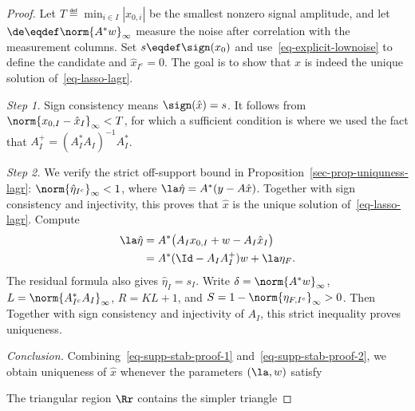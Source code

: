 \begin{proof}
    Let $T \eqdef \min_{i \in I} |x_{0,i}|$ be the smallest nonzero signal amplitude, and let $\de \eqdef \norm{A^* w}_\infty$
    measure the noise after correlation with the measurement columns.
    Set $s \eqdef \sign(x_0)$ and use~\eqref{eq-explicit-lownoise} to define the candidate
	and $\hat x_{I^c}=0$. The goal is to show that $\hat x$ is indeed the unique solution of~\eqref{eq-lasso-lagr}. 
	
	
    \noindent\textit{Step 1.} Sign consistency means $\sign(\hat x)=s$. It follows from $\norm{x_{0,I}-\hat x_I}_\infty < T$, for which a sufficient condition is
	where we used the fact that $A_I^+ = (A_I^*A_I)^{-1} A_I^*$.
	
    \noindent\textit{Step 2.} We verify the strict off-support bound in Proposition~\ref{sec-prop-uniquness-lagr}: $\norm{\hat \eta_{I^c}}_\infty < 1$, where $\la \hat \eta = A^* (y-A \hat x)$. Together with sign consistency and injectivity, this proves that $\hat x$ is the unique solution of~\eqref{eq-lasso-lagr}. Compute
	\begin{align*}
		\la \hat \eta &= A^*\big(A_Ix_{0,I}+w-A_I\hat x_I\big) \\
			&=  A^* ( \Id - A_I A_I^+ ) w + \la \eta_F.
	\end{align*}
The residual formula also gives $\hat\eta_I=s_I$. Write $\delta=\norm{A^*w}_\infty$, $L=\norm{A_{I^c}^*A_I}_\infty$, $R=KL+1$, and $S=1-\norm{\eta_{F,I^c}}_\infty>0$. Then
Together with sign consistency and injectivity of $A_I$, this strict inequality proves uniqueness.

    \noindent\textit{Conclusion.} Combining~\eqref{eq-supp-stab-proof-1} and~\eqref{eq-supp-stab-proof-2}, we obtain uniqueness of $\hat x$ whenever the parameters $(\la,w)$ satisfy
	
	
    The triangular region $\Rr$ contains the simpler triangle
\end{proof}

